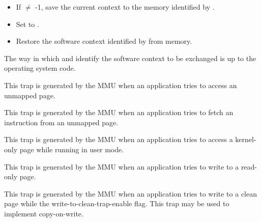 \begin{itemize}
\item If  $\neq$ -1, save the current context to the memory
identified by .
\item Set  to .
\item Restore the software context identified by  from memory.
\end{itemize}

The way in which  and  identify the software context to be
exchanged is up to the operating system code.



This trap is generated by the MMU when an application tries to access an
unmapped page.



This trap is generated by the MMU when an application tries to fetch an
instruction from an unmapped page.



This trap is generated by the MMU when an application tries to access a
kernel-only page while running in user mode.



This trap is generated by the MMU when an application tries to write to a
read-only page.



This trap is generated by the MMU when an application tries to write to a clean
page while the write-to-clean-trap-enable flag.
 This trap may be used to
implement copy-on-write.

